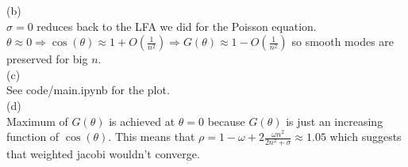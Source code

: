 \documentclass[a4paper,12pt]{article}
\begin{document}
(b) \\
$\sigma = 0$ reduces back to the LFA we did for the Poisson equation.
$\theta \approx 0 \Rightarrow \cos(\theta)
    \approx 1 + O \left(\frac{1}{n^{2}}\right) \Rightarrow G(\theta) \approx 1 - O \left(\frac{1}{n^{2}}\right)$
so smooth modes are preserved for big $n$. \\
(c) \\
See code/main.ipynb for the plot. \\

(d)\\
Maximum of $G(\theta)$ is achieved at $\theta =0$ because $G(\theta)$ is just
an increasing function of $\cos(\theta)$. This means that
$\rho = 1-\omega + 2 \frac{\omega n^{2}}{2 n^{2} + \sigma}  \approx 1.05 $
which suggests that weighted jacobi wouldn't converge.
\end{document}
